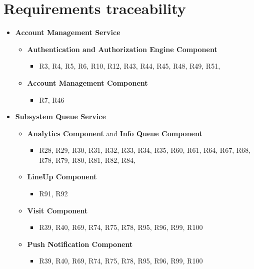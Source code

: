 \section{Requirements traceability}
\label{sect:requirementstrceability}
\begin{itemize}
  \item \textbf{Account Management Service}
    \begin{itemize}
        \item \textbf{Authentication and Authorization Engine Component}
               \begin{itemize}
                \item R3, R4, R5, R6, R10, R12, R43, R44, R45, R48, R49, R51,
               \end{itemize}
         \item \textbf{Account Management Component}
               \begin{itemize}
                \item R7, R46
               \end{itemize}
    \end{itemize}
    \item \textbf{Subsystem Queue Service}
        \begin{itemize}
             \item \textbf{Analytics Component} and \textbf{Info Queue Component} 
                 \begin{itemize}
                     \item R28, R29, R30, R31, R32, R33, R34, R35, R60, R61, R64, R67, R68, R78, R79, R80, R81, R82, R84,
                \end{itemize}
             \item \textbf{LineUp  Component} 
                 \begin{itemize}
                          \item R91, R92
                 \end{itemize}
            \item \textbf{Visit  Component} 
                 \begin{itemize}
                         \item R39, R40, R69, R74, R75, R78, R95, R96, R99, R100
                 \end{itemize}
                 \item \textbf{Push Notification  Component} 
                 \begin{itemize}
                         \item R39, R40, R69, R74, R75, R78, R95, R96, R99, R100

\end{itemize}
\end{itemize}
\end{itemize}
